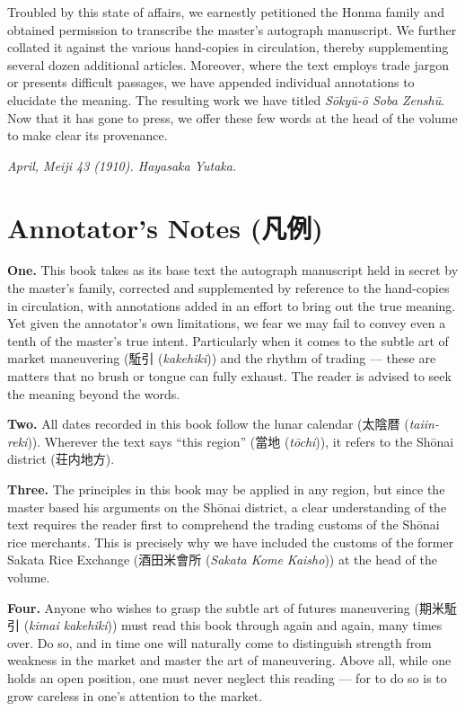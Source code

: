 \documentclass[10pt, openany]{book}
\newcommand{\jp}[1]{{\japanesefont #1}}
\newcommand{\jt}[2]{\jp{#1} (\textit{#2})}
\begin{document}
Troubled by this state of affairs, we earnestly petitioned the Honma
family and obtained permission to transcribe the master's autograph
manuscript. We further collated it against the various hand-copies in
circulation, thereby supplementing several dozen additional articles.
Moreover, where the text employs trade jargon or presents difficult
passages, we have appended individual annotations to elucidate the
meaning. The resulting work we have titled \textit{S\=oky\=u-\=o Soba
Zensh\=u}. Now that it has gone to press, we offer these few words at
the head of the volume to make clear its provenance.

\begin{flushright}
\textit{April, Meiji 43 (1910). Hayasaka Yutaka.}
\end{flushright}

\section{Annotator's Notes (\jp{凡例})}

\textbf{One.} This book takes as its base text the autograph manuscript
held in secret by the master's family, corrected and supplemented by
reference to the hand-copies in circulation, with annotations added in
an effort to bring out the true meaning. Yet given the annotator's own
limitations, we fear we may fail to convey even a tenth of the master's
true intent. Particularly when it comes to the subtle art of market
maneuvering (\jt{駈引}{kakehiki}) and the rhythm of trading --- these
are matters that no brush or tongue can fully exhaust. The reader is
advised to seek the meaning beyond the words.

\textbf{Two.} All dates recorded in this book follow the lunar calendar
(\jt{太陰暦}{taiin-reki}). Wherever the text says ``this region''
(\jt{當地}{t\=ochi}), it refers to the Sh\=onai district
(\jp{荘内地方}).

\textbf{Three.} The principles in this book may be applied in any
region, but since the master based his arguments on the Sh\=onai
district, a clear understanding of the text requires the reader first to
comprehend the trading customs of the Sh\=onai rice merchants. This is
precisely why we have included the customs of the former Sakata Rice
Exchange (\jt{酒田米會所}{Sakata Kome Kaisho}) at the head of the
volume.

\textbf{Four.} Anyone who wishes to grasp the subtle art of futures
maneuvering (\jt{期米駈引}{kimai kakehiki}) must read this book through
again and again, many times over. Do so, and in time one will naturally
come to distinguish strength from weakness in the market and master the
art of maneuvering. Above all, while one holds an open position, one
must never neglect this reading --- for to do so is to grow careless in
one's attention to the market.
\end{document}
